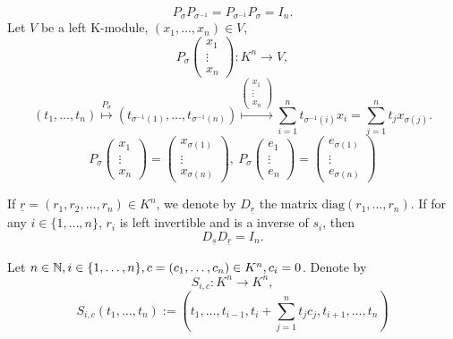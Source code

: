 \documentclass{book}
\numberwithin{equation}{section}
\begin{document}
\begin{box2}
    $$P_\sigma P_{\sigma^{-1}}=P_{\sigma^{-1}}P_\sigma=I_{n}.$$
    Let $V$ be a left K-module, $(x_1,\dots,x_n)\in V$,
    $$P_\sigma\begin{pmatrix}
 x_1\\
 \vdots\\
x_n
\end{pmatrix}
:K^n\longrightarrow V,$$
$$(t_1,\dots,t_n)\overset{P_\sigma}{\longmapsto}(t_{\sigma^{-1}(1)},\dots,t_{\sigma^{-1}(n)})\overset{\begin{pmatrix}
 x_1\\
 \vdots\\
x_n
\end{pmatrix}}{\longmapsto}\sum_{i=1}^{n}t_{\sigma^{-1}(i)}x_i=\sum_{j=1}^{n}t_jx_{\sigma(j)}.$$
$$P_\sigma\begin{pmatrix}
    x_1\\
    \vdots\\
    x_n
\end{pmatrix}=\begin{pmatrix}
    x_{\sigma(1)}\\
    \vdots\\
    x_{\sigma(n)}
\end{pmatrix},\ P_\sigma\begin{pmatrix}
    e_1\\
    \vdots\\
    e_n
\end{pmatrix}=\begin{pmatrix}
    e_{\sigma(1)}\\
    \vdots\\
    e_{\sigma(n)}
\end{pmatrix}$$
\end{box2}
\begin{definitionenv}
    If $\underline{r}=(r_1,r_2,\dots,r_n)\in K^n$, we denote by $D_{\underline{r}}$ the matrix $\mathrm{diag}(r_1,\dots,r_n)$.
    If for any $i\in \{1,\dots,n\}$, $r_i$ is left invertible and is a inverse of $s_i$, then 
    $$D_{\underline{s}}D_{\underline{r}}=I_n.$$
\end{definitionenv}
\begin{definitionenv}
    Let $n\in \mathbb{N}, i\in \{1,\dots,n\},c=\left(c_1,\dots,c_n\right)\in K^n,c_i=0$. Denote by 
    $$S_{i,c}:K^n\longrightarrow K^n,$$
    $$S_{i,c}(t_1,\dots,t_n):=\left(t_1,\dots,t_{i-1},t_i+\sum_{j=1}^{n}t_jc_j,t_{i+1},\dots,t_n\right)$$
\end{definitionenv}
\end{document}
